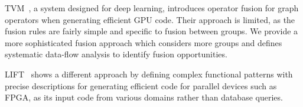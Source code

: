 

TVM~\cite{Chen18:TVM}, a system designed for deep learning, introduces
operator fusion for graph operators when generating efficient GPU code.
Their approach is limited, as the fusion rules are fairly simple and
specific to fusion between groups.
We provide a more sophisticated fusion approach which considers more groups
and defines systematic data-flow analysis to identify fusion opportunities.

LIFT~\cite{Kristien19:LiftPatterns} shows a different approach by defining
complex functional patterns with precise descriptions for generating efficient
code for parallel devices such as FPGA, as its input code from various domains
rather than database queries.



